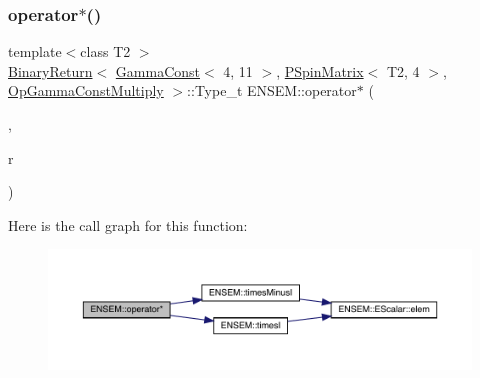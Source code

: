 \subsubsection{\texorpdfstring{operator$\ast$()}{operator*()}\hspace{0.1cm}{\footnotesize\ttfamily [12/64]}}
{\footnotesize\ttfamily template$<$class T2 $>$ \\
\mbox{\hyperlink{structENSEM_1_1BinaryReturn}{Binary\+Return}}$<$ \mbox{\hyperlink{classENSEM_1_1GammaConst}{Gamma\+Const}}$<$ 4, 11 $>$, \mbox{\hyperlink{classENSEM_1_1PSpinMatrix}{P\+Spin\+Matrix}}$<$ T2, 4 $>$, \mbox{\hyperlink{structENSEM_1_1OpGammaConstMultiply}{Op\+Gamma\+Const\+Multiply}} $>$\+::Type\+\_\+t E\+N\+S\+E\+M\+::operator$\ast$ (\begin{DoxyParamCaption}\item[{const \mbox{\hyperlink{classENSEM_1_1GammaConst}{Gamma\+Const}}$<$ 4, 11 $>$ \&}]{,  }\item[{const \mbox{\hyperlink{classENSEM_1_1PSpinMatrix}{P\+Spin\+Matrix}}$<$ T2, 4 $>$ \&}]{r }\end{DoxyParamCaption})\hspace{0.3cm}{\ttfamily [inline]}}

Here is the call graph for this function\+:\nopagebreak
\begin{figure}[H]
\begin{center}
\leavevmode
\includegraphics[width=350pt]{d6/df5/group__primspinmatrix_gaa5f831eba31e036c6d9d828c992751ae_cgraph}
\end{center}
\end{figure}
\mbox{\label{group__primspinmatrix_gac3b96a9e74f7c7170ae4c2713382e011}} 
